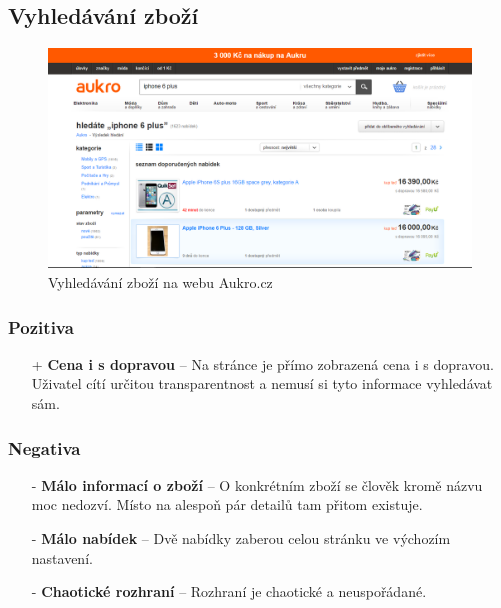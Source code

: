 
\newpage
\subsection{Vyhledávání zboží}
\begin{figure}[h]
    \centering
    \includegraphics[width=1.0\textwidth]{media/aukro/search.png}
    \caption{Vyhledávání zboží na webu Aukro.cz}
    \label{fig:aukro:search}
\end{figure}
\subsubsection*{Pozitiva}
\begin{itemize}
    \item[+] \textbf{Cena i s dopravou} -- Na stránce je přímo zobrazená cena i s dopravou. Uživatel cítí určitou transparentnost a nemusí si tyto informace vyhledávat sám.
\end{itemize}
\subsubsection*{Negativa}
\begin{itemize}
    \item[-] \textbf{Málo informací o zboží} -- O konkrétním zboží se člověk kromě názvu moc nedozví. Místo na alespoň pár detailů tam přitom existuje.
    \item[-] \textbf{Málo nabídek} -- Dvě nabídky zaberou celou stránku ve výchozím nastavení.
    \item[-] \textbf{Chaotické rozhraní} -- Rozhraní je chaotické a neuspořádané.
\end{itemize}




